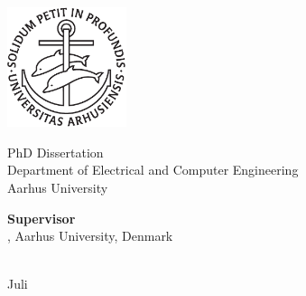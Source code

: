 \begin{titlepage}
\begin{center}


\null\vspace{2cm}
{\huge \thesisTitle\par}
\vspace{1cm}
\textcolor{black}{\large{\student}}
    
\vspace{8cm}

\includegraphics[width=3.5cm]{figures/au-segl.pdf}


\vspace{1cm}
{\large
PhD Dissertation\\
Department of Electrical and Computer Engineering\\
Aarhus University\\
\the\year
}

\end{center}
\vspace{2cm}
\end{titlepage}


\thispagestyle{empty}
%

\null\vspace{19.5cm}
\textbf{Supervisor}\\
\supervisor, Aarhus University, Denmark

\vfill
\begin{center}
\textit{\thesisTitle}\\
\textcopyright \hspace{0.1mm} Juli \the\year
\end{center}

